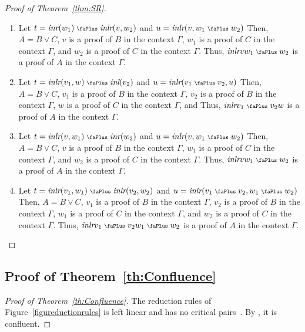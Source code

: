 \documentclass[screen, sigconf,authorversion,nonacm]{acmart}
\theoremstyle{acmdefinition}
\numberwithin{equation}{section}
\newcommand\inl{\mbox{\it inl}}
\newcommand\inr{\mbox{\it inr}}
\newcommand\inlr{\mbox{\it inlr}}
\newcommand\plus{\mathrel{\text{\normalfont\scalebox{0.7}{\faPlus}}}}
\begin{document}
\begin{proof}[Proof of Theorem~\ref{thm:SR}]
\begin{enumerate}
    \item Let $t=\inr(w_1) \plus \inlr(v,w_2)$ and $u=\inlr(v,w_1 \plus w_2) $
      Then, $A=B\vee C$,
      $v$ is a proof of $B$ in the context $\Gamma$,
      $w_1$ is a proof of $C$ in the context $\Gamma$, and
      $w_2$ is a proof of $C$ in the context $\Gamma$.
      Thus, $\inlr{v}{w_1\plus w_2}$ is a proof of $A$ in the context $\Gamma$.
    \item Let $t=\inlr(v_1,w) \plus \inl(v_2) $ and $u= \inlr(v_1 \plus v_2,u) $
      Then, $A=B\vee C$,
      $v_1$ is a proof of $B$ in the context $\Gamma$,
      $v_2$ is a proof of $B$ in the context $\Gamma$,
      $w$ is a proof of $C$ in the context $\Gamma$, and
      Thus, $\inlr{v_1\plus v_2}{w}$ is a proof of $A$ in the context $\Gamma$.
    \item Let $t=\inlr(v,w_1) \plus \inr(w_2) $ and $u= \inlr(v,w_1 \plus w_2) $
      Then, $A=B\vee C$,
      $v$ is a proof of $B$ in the context $\Gamma$,
      $w_1$ is a proof of $C$ in the context $\Gamma$, and
      $w_2$ is a proof of $C$ in the context $\Gamma$.
      Thus, $\inlr{v}{w_1\plus w_2}$ is a proof of $A$ in the context $\Gamma$.
    \item Let $t=\inlr(v_1,w_1) \plus \inlr(v_2,w_2) $ and $u= \inlr(v_1 \plus v_2,w_1 \plus w_2)$
      Then, $A=B\vee C$,
      $v_1$ is a proof of $B$ in the context $\Gamma$,
      $v_2$ is a proof of $B$ in the context $\Gamma$,
      $w_1$ is a proof of $C$ in the context $\Gamma$, and
      $w_2$ is a proof of $C$ in the context $\Gamma$.
      Thus, $\inlr{v_1\plus v_2}{w_1\plus w_2}$ is a proof of $A$ in the context $\Gamma$.
      \qedhere
  \end{enumerate}
\end{proof}

\subsection{Proof of Theorem~\ref{th:Confluence}}
\begin{proof}[Proof of Theorem~\ref{th:Confluence}]
  The reduction rules of Figure~\ref{figureductionrules} is left linear
  and has no critical pairs~\cite[Section 6]{Nipkow}.  By \cite[Theorem
  6.8]{Nipkow}, it is confluent.  \qedhere
\end{proof}
\end{document}
